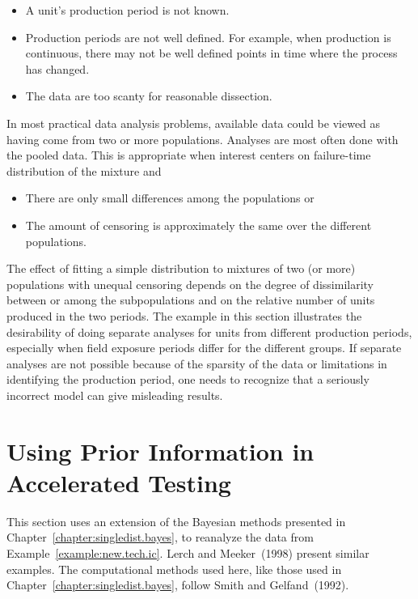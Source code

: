 \begin{itemize}
\item
A unit's production period is not known.
\item
Production periods are not well defined. For example, when
production is continuous, there may not be well defined points in
time where the process has changed.
\item
The data are too scanty for reasonable dissection.
\end{itemize}

In most practical data analysis problems, available data could be
viewed as having come from two or more populations. Analyses are
most often done with the pooled data. This is appropriate when
interest centers on failure-time distribution of the mixture and
\begin{itemize}
\item
There are only small differences among the populations or
\item
The amount of censoring is approximately the same over the
different populations.
\end{itemize}

The effect of fitting a simple distribution to mixtures of two (or more)
populations with unequal censoring depends on the degree of
dissimilarity between or among the subpopulations and on the
relative number of units produced in the two periods.  The example
in this section illustrates the desirability of doing separate
analyses for units from different production periods, especially
when field exposure periods differ for the different groups.  If
separate analyses are not possible because of the sparsity of the
data or limitations in identifying the production period, one needs
to recognize that a seriously incorrect model can give misleading
results.

\section{Using Prior Information in Accelerated Testing}
\label{section:bayes.acceleration}
This section uses an extension of the Bayesian methods presented in
Chapter~\ref{chapter:singledist.bayes}, to reanalyze the data from
Example~\ref{example:new.tech.ic}.  Lerch and Meeker~(1998) present
similar examples. The computational methods used here, like
those used in Chapter~\ref{chapter:singledist.bayes}, follow
Smith and Gelfand~(1992).

